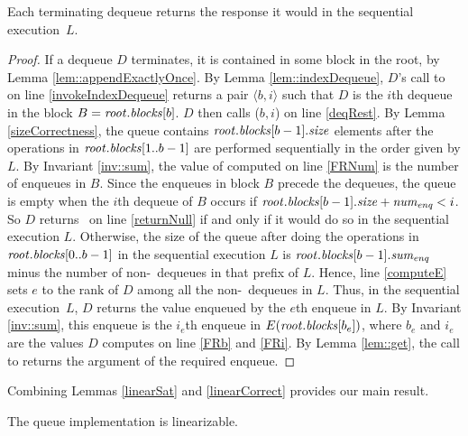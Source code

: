 \begin{lemma}\label{linearCorrect}
Each terminating dequeue returns the response it would in the sequential execution~$L$.
\end{lemma}
\begin{proof}
If a dequeue $D$ terminates, it is contained in some block in the root, by Lemma \ref{lem::appendExactlyOnce}.
By Lemma \ref{lem::indexDequeue}, $D$'s call to  on line \ref{invokeIndexDequeue}
returns a pair $\langle b,i\rangle$ such that $D$ is the $i$th dequeue in the block 
$B=\mbox{\textnormal{\textit{root}}}.\mbox{\textit{blocks}}[b]$.
$D$ then calls ($b,i$) on line \ref{deqRest}.
By Lemma \ref{sizeCorrectness}, the queue contains $\mbox{\textnormal{\textit{root}}}.\mbox{\textit{blocks}}[b-1].\mbox{\textit{size}}$ elements
after the operations in $\mbox{\textnormal{\textit{root}}}.\mbox{\textit{blocks}}[1..b-1]$ are performed sequentially 
in the order given by $L$.
By Invariant \ref{inv::sum}, the value of  computed on line \ref{FRNum}
is the number of enqueues in $B$.
Since the enqueues in block $B$ precede the dequeues,
the queue is empty when the $i$th dequeue of $B$ occurs if 
$\mbox{\textnormal{\textit{root}}}.\mbox{\textit{blocks}}[b-1].\mbox{\textit{size}} + \mbox{\textnormal{\textit{num\textsubscript{enq}}}} < i$.
So $D$ returns \nl\ on line \ref{returnNull} if and only if it would do so in the sequential
execution $L$.
Otherwise, the size of the queue after doing the operations in $\mbox{\textnormal{\textit{root}}}.\mbox{\textit{blocks}}[0..b-1]$
in the sequential execution $L$ is $\mbox{\textnormal{\textit{root}}}.\mbox{\textit{blocks}}[b-1].\mbox{\textit{sum\textsubscript{enq}}}$ minus
the number of non-\nl\ dequeues in that prefix of $L$.
Hence, line \ref{computeE} sets $e$ to the rank of $D$ among all the non-\nl\ dequeues in $L$.
Thus, in the sequential execution~$L$, $D$ returns the value enqueued by the $e$th enqueue in $L$.
By Invariant \ref{inv::sum}, this enqueue is the $i_e$th enqueue 
in $E(\mbox{\textnormal{\textit{root}}}.\mbox{\textit{blocks}}[b_e])$, where
$b_e$ and $i_e$ are the values $D$ computes on line \ref{FRb} and \ref{FRi}.
By Lemma \ref{lem::get}, the call to  returns the argument of the required enqueue.
\end{proof}

Combining Lemmas \ref{linearSat} and \ref{linearCorrect} provides our main result.

\begin{mytheorem}
The queue implementation is linearizable.
\end{mytheorem}


